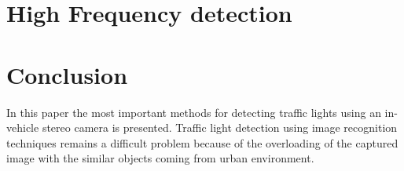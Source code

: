 \documentclass[letterpaper, 10 pt, conference]{ieeeconf} %
\begin{document}
\section{High Frequency detection}


\section{Conclusion}
In this paper the most important methods for detecting traffic lights using an in-vehicle stereo camera is presented. Traffic light detection using image recognition techniques remains a difficult problem because of the overloading of the captured image with the similar objects coming from urban environment. 

\addtolength{\textheight}{-12cm} %


\end{document}

